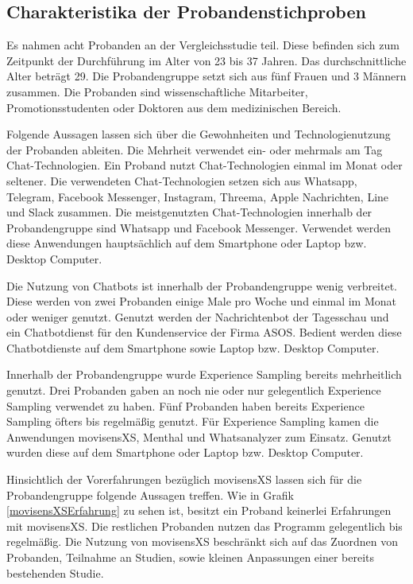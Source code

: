 \subsection{Charakteristika der Probandenstichproben}
Es nahmen acht Probanden an der Vergleichsstudie teil. Diese befinden sich zum Zeitpunkt der Durchführung im Alter von 23 bis 37 Jahren. Das durchschnittliche Alter beträgt 29. Die Probandengruppe setzt sich aus fünf Frauen und 3 Männern zusammen. Die Probanden sind wissenschaftliche Mitarbeiter, Promotionsstudenten oder Doktoren aus dem medizinischen Bereich. 

Folgende Aussagen lassen sich über die Gewohnheiten und Technologienutzung der Probanden ableiten. Die Mehrheit verwendet ein- oder mehrmals am Tag Chat-Technologien. Ein Proband nutzt Chat-Technologien 
einmal im Monat oder seltener. Die verwendeten Chat-Technologien setzen sich aus Whatsapp, Telegram, Facebook Messenger, Instagram, Threema, Apple Nachrichten, Line und Slack zusammen. Die meistgenutzten Chat-Technologien innerhalb der Probandengruppe sind Whatsapp und Facebook Messenger. Verwendet werden diese Anwendungen hauptsächlich auf dem Smartphone oder Laptop bzw. Desktop Computer. 

Die Nutzung von Chatbots ist innerhalb der Probandengruppe wenig verbreitet. Diese werden von zwei Probanden einige Male pro Woche und einmal im Monat oder weniger genutzt. Genutzt werden der Nachrichtenbot der Tagesschau und ein Chatbotdienst für den Kundenservice der Firma ASOS. Bedient werden diese Chatbotdienste auf dem Smartphone sowie Laptop bzw. Desktop Computer. 

Innerhalb der Probandengruppe wurde Experience Sampling bereits mehrheitlich genutzt. Drei Probanden gaben an noch nie oder nur gelegentlich Experience Sampling verwendet zu haben. Fünf Probanden haben bereits Experience Sampling öfters bis regelmäßig genutzt. Für Experience Sampling kamen die Anwendungen movisensXS, Menthal und Whatsanalyzer zum Einsatz. Genutzt wurden diese auf dem Smartphone oder Laptop bzw. Desktop Computer. 

Hinsichtlich der Vorerfahrungen bezüglich movisensXS lassen sich für die Probandengruppe folgende Aussagen treffen. Wie in Grafik \ref{movisensXSErfahrung} zu sehen ist, besitzt ein Proband keinerlei Erfahrungen mit movisensXS. Die restlichen Probanden nutzen das Programm gelegentlich bis regelmäßig. Die Nutzung von movisensXS beschränkt sich auf das Zuordnen von Probanden, Teilnahme an Studien, sowie kleinen Anpassungen einer bereits bestehenden Studie. 

